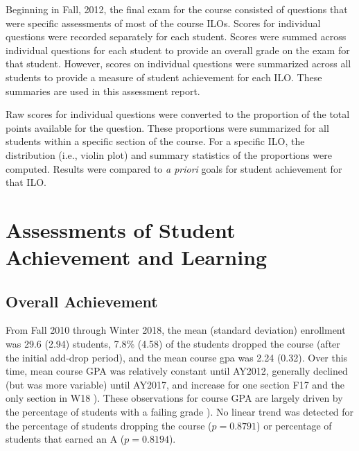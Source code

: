\documentclass{article}\usepackage[]{graphicx}\usepackage[]{color}
\begin{document}
Beginning in Fall, 2012, the final exam for the course consisted of questions that were specific assessments of most of the course ILOs. Scores for individual questions were recorded separately for each student. Scores were summed across individual questions for each student to provide an overall grade on the exam for that student. However, scores on individual questions were summarized across all students to provide a measure of student achievement for each ILO. These summaries are used in this assessment report.

Raw scores for individual questions were converted to the proportion of the total points available for the question. These proportions were summarized for all students within a specific section of the course. For a specific ILO, the distribution (i.e., violin plot) and summary statistics of the proportions were computed. Results were compared to \emph{a priori} goals for student achievement for that ILO.


\newpage
\section{Assessments of Student Achievement and Learning}
\subsection{Overall Achievement}



From Fall 2010 through Winter 2018, the mean (standard deviation) enrollment was 29.6 (2.94) students, 7.8\% (4.58) of the students dropped the course (after the initial add-drop period), and the mean course gpa was 2.24 (0.32). Over this time, mean course GPA was relatively constant until AY2012, generally declined (but was more variable) until AY2017, and increase for one section F17 and the only section in W18 ). These observations for course GPA are largely driven by the percentage of students with a failing grade ). No linear trend was detected for the percentage of students dropping the course ($p=0.8791$) or percentage of students that earned an A ($p=0.8194$).
\end{document}
